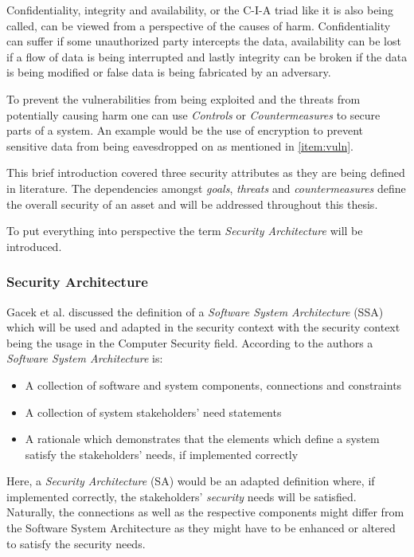 Confidentiality, integrity and availability, or the C-I-A triad like it is also being called, can be viewed from a perspective of the causes of harm. Confidentiality can suffer if some unauthorized party intercepts the data, availability can be lost if a flow of data is being interrupted and lastly integrity can be broken if the data is being modified or false data is being fabricated by an adversary.

To prevent the vulnerabilities from being exploited and the threats from potentially causing harm one can use \textit{Controls} or \textit{Countermeasures} to secure parts of a system. An example would be the use of encryption to prevent sensitive data from being eavesdropped on as mentioned in \ref{item:vuln}. 

This brief introduction covered three security attributes as they are being defined in literature. The dependencies amongst \textit{goals}, \textit{threats} and \textit{countermeasures} define the overall security of an asset and will be addressed throughout this thesis. 

To put everything into perspective the term \textit{Security Architecture} will be introduced.

\subsubsection{Security Architecture}

Gacek et al. \cite{Gacek95onthe} discussed the definition of a \textit{Software System Architecture} (SSA) which will be used and adapted in the security context with the security context being the usage in the Computer Security field. According to the authors a \textit{Software System Architecture} is:

\begin{itemize}
\item A collection of software and system components, connections and constraints
\item A collection of system stakeholders' need statements
\item A rationale which demonstrates that the elements which define a system satisfy the stakeholders' needs, if implemented correctly
\end{itemize}

Here, a \textit{Security Architecture} (SA) would be an adapted definition where, if implemented correctly, the stakeholders' \textit{security} needs will be satisfied. Naturally, the connections as well as the respective components might differ from the Software System Architecture as they might have to be enhanced or altered to satisfy the security needs. 

